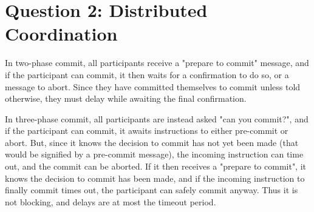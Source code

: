 \section{Question 2: Distributed Coordination}

In two-phase commit, all participants receive a "prepare to commit" message, and if the participant can commit, it then waits for a confirmation to do so, or a message to abort. Since they have committed themselves to commit unless told otherwise, they must delay while awaiting the final confirmation.

In three-phase commit, all participants are instead asked "can you commit?", and if the participant can commit, it awaits instructions to either pre-commit or abort. But, since it knows the decision to commit has not yet been made (that would be signified by a pre-commit message), the incoming instruction can time out, and the commit can be aborted. If it then receives a "prepare to commit", it knows the decision to commit has been made, and if the incoming instruction to finally commit times out, the participant can safely commit anyway. Thus it is not blocking, and delays are at most the timeout period.
